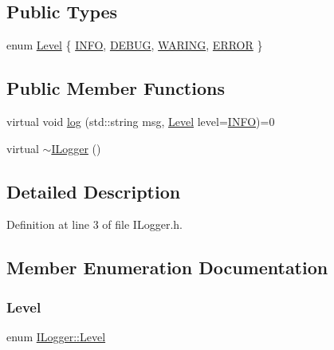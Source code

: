 \subsection*{Public Types}
\begin{DoxyCompactItemize}
\item 
enum \hyperlink{class_i_logger_af129a40b0950160d0fe6c6b675d9d761}{Level} \{ \hyperlink{class_i_logger_af129a40b0950160d0fe6c6b675d9d761a1de9525e76b4d18631d4371fb0e4697c}{I\+N\+FO}, 
\hyperlink{class_i_logger_af129a40b0950160d0fe6c6b675d9d761a8d9f1b016a76655dab45b63a335227af}{D\+E\+B\+UG}, 
\hyperlink{class_i_logger_af129a40b0950160d0fe6c6b675d9d761ace8c0022cd4dd8851aea339bfcd19e32}{W\+A\+R\+I\+NG}, 
\hyperlink{class_i_logger_af129a40b0950160d0fe6c6b675d9d761ad8c193b079fed311195eb87f00d088c8}{E\+R\+R\+OR}
 \}
\end{DoxyCompactItemize}
\subsection*{Public Member Functions}
\begin{DoxyCompactItemize}
\item 
virtual void \hyperlink{class_i_logger_ad7ebc4b8b6a509f4c3b973343c5fc1f1}{log} (std\+::string msg, \hyperlink{class_i_logger_af129a40b0950160d0fe6c6b675d9d761}{Level} level=\hyperlink{class_i_logger_af129a40b0950160d0fe6c6b675d9d761a1de9525e76b4d18631d4371fb0e4697c}{I\+N\+FO})=0
\item 
virtual \hyperlink{class_i_logger_a7d730ad60d54f59031fa68e93d088cc0}{$\sim$\+I\+Logger} ()
\end{DoxyCompactItemize}


\subsection{Detailed Description}


Definition at line 3 of file I\+Logger.\+h.



\subsection{Member Enumeration Documentation}
\mbox{\label{class_i_logger_af129a40b0950160d0fe6c6b675d9d761}} 
\subsubsection{\texorpdfstring{Level}{Level}}
{\footnotesize\ttfamily enum \hyperlink{class_i_logger_af129a40b0950160d0fe6c6b675d9d761}{I\+Logger\+::\+Level}}

